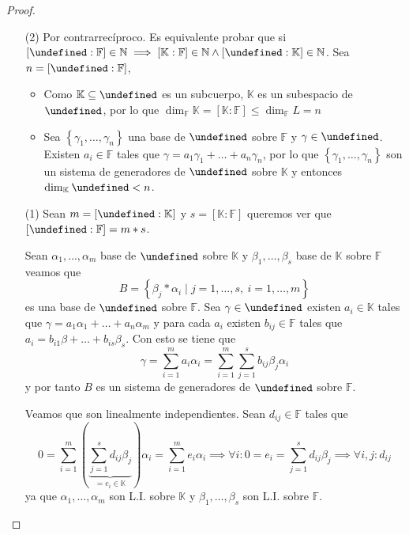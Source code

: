\documentclass[10pt, spanish]{report}
\theoremstyle{definition}
\newcommand{\N}{\mathbb{N}}
\newcommand{\F}{\mathbb{F}}
\newcommand{\K}{\mathbb{K}}
\let\L\undefined
\newcommand{\L}{\mathbb{L}}
\renewcommand{\leq}{\leqslant}
\begin{document}
\begin{proof}\hspace{0pt}
    \begin{enumerate}
        \item[(2)] Por contrarrecíproco. Es equivalente probar que si
            $[\L:\F]\in \N\implies[\K:\F]\in \N \wedge[\L:\K]\in \N$. Sea
            $n=[\L:\F]$,
            \begin{itemize}
                \item Como $\K\subseteq\L$ es un subcuerpo, $\K$ es un
                    subespacio de $\L$, por lo que $\dim_\F{\K}=[\K:\F]\leq
                    \dim_\F{L}=n$
                \item Sea $\left\{ \gamma_1,\ldots,\gamma_n \right\}$ una base
                    de $\L$ sobre $\F$ y $\gamma\in \L$. Existen $a_i\in\F$ tales
                    que $\gamma=a_1\gamma_1+\ldots+a_n\gamma_n$, por lo que
                    $\left\{ \gamma_1,\ldots,\gamma_n \right\} $ son un sistema
                    de generadores de $\L$ sobre $\K$ y entonces
                    $\dim_\K{\L}<n$.
            \end{itemize}
        \item[(1)] Sean $m=[\L:\K]$ y $s=[\K:\F]$ queremos ver que
            $[\L:\F]=m*s$.

            Sean $\alpha_1,\ldots,\alpha_m$ base de $\L$ sobre
            $\K$ y $\beta_1,\ldots,\beta_s$ base de $\K$ sobre $\F$ veamos que
            \[B=\left\{\beta_j*\alpha_i\mid j=1,\ldots,s,\ i=1,\ldots,m\right\}\]
            es una base de $\L$ sobre $\F$. Sea $\gamma\in\L$ existen $a_i\in\K$
            tales que $\gamma=a_1\alpha_1+\ldots+a_n\alpha_m$ y para cada $a_i$
            existen $b_{ij}\in\F$ tales que $a_i=b_{i1}\beta+\ldots+b_{is}
            \beta_s$. Con esto se tiene que \[\gamma=\sum_{i=1}^{m}a_i\alpha_i=
            \sum_{i=1}^m\sum_{j=1}^sb_{ij}\beta_j\alpha_i\] y por tanto $B$ es
            un sistema de generadores de $\L$ sobre $\F$.

            Veamos que son linealmente independientes. Sean $d_{ij}\in\F$ tales
            que
            \[0=\sum_{i=1}^m(\underbrace{\sum_{j=1}^sd_{ij}\beta_j}_{=e_i\in\K})
            \alpha_i=\sum_{i=1}^me_i\alpha_i\implies\forall i: 0=e_i=\sum_{j=1}^sd_{ij}
            \beta_j\implies\forall i,j: d_{ij}\]
            ya que $\alpha_1,\ldots,\alpha_m$ son L.I. sobre $\K$ y
            $\beta_1,\ldots,\beta_s$ son L.I. sobre $\F$.
    \end{enumerate}
\end{proof}
\end{document}

